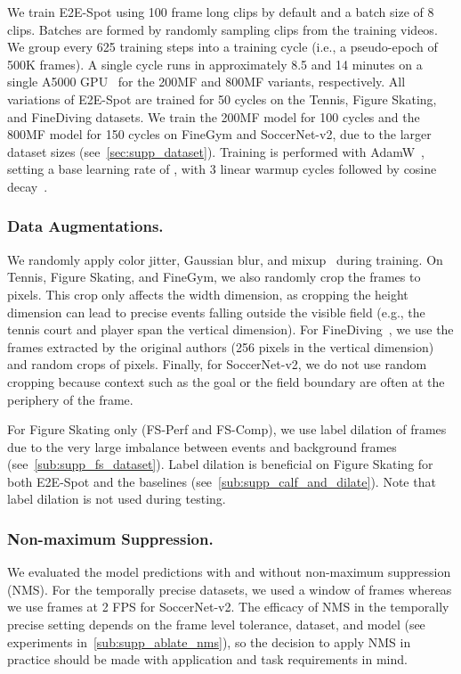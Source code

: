 \documentclass[runningheads]{llncs}
\newcommand{\OURMETHOD}{{E2E-Spot}\xspace}
\newcommand{\fscomp}{{FS-Comp}\xspace}
\newcommand{\fsperf}{{FS-Perf}\xspace}
\newcommand{\finegym}{{FineGym}\xspace}
\newcommand{\finediving}{{FineDiving}\xspace}
\newcommand{\soccernet}{{SoccerNet-v2}\xspace}
\begin{document}
We train \OURMETHOD using 100 frame long clips by default and a batch size of 8 clips.
Batches are formed by randomly sampling clips from the training videos.
We group every 625 training steps into a training cycle (i.e., a pseudo-epoch of 500K frames).
A single cycle runs in approximately 8.5 and 14 minutes on a single A5000 GPU~\cite{rtxa5000} for the 200MF and 800MF variants, respectively.
All variations of \OURMETHOD are trained for 50 cycles on the Tennis, Figure Skating, and \finediving datasets.
We train the 200MF model for 100 cycles and the 800MF model for 150 cycles on \finegym and \soccernet, due to the larger dataset sizes (see~\autoref{sec:supp_dataset}).
Training is performed with AdamW~\cite{adamw}, setting a base learning rate of , with 3 linear warmup cycles followed by cosine decay~\cite{cosinelr}.

\subsubsection*{Data Augmentations.}
We randomly apply color jitter, Gaussian blur, and mixup~\cite{mixup} during training.
On Tennis, Figure Skating, and \finegym, we also randomly crop the  frames to  pixels.
This crop only affects the width dimension, as cropping the height dimension can lead to precise events falling outside the visible field (e.g., the tennis court and player span the vertical dimension).
For \finediving~\cite{finediving}, we use the frames extracted by the original authors (256 pixels in the vertical dimension) and random crops of  pixels.
Finally, for \soccernet, we do not use random cropping because context such as the goal or the field boundary are often at the periphery of the frame.

For Figure Skating only (\fsperf and \fscomp), we use label dilation of  frames due to the very large imbalance between events and background frames (see~\autoref{sub:supp_fs_dataset}).
Label dilation is beneficial on Figure Skating for both \OURMETHOD and the baselines (see~\autoref{sub:supp_calf_and_dilate}).
Note that label dilation is not used during testing.

\subsubsection*{Non-maximum Suppression.}
We evaluated the model predictions with and without non-maximum suppression (NMS).
For the temporally precise datasets, we used a window of  frames whereas we use  frames at 2 FPS for \soccernet.
The efficacy of NMS in the temporally precise setting depends on the frame level tolerance, dataset, and model (see experiments in~\autoref{sub:supp_ablate_nms}), so the decision to apply NMS in practice should be made with application and task requirements in mind.
\end{document}
